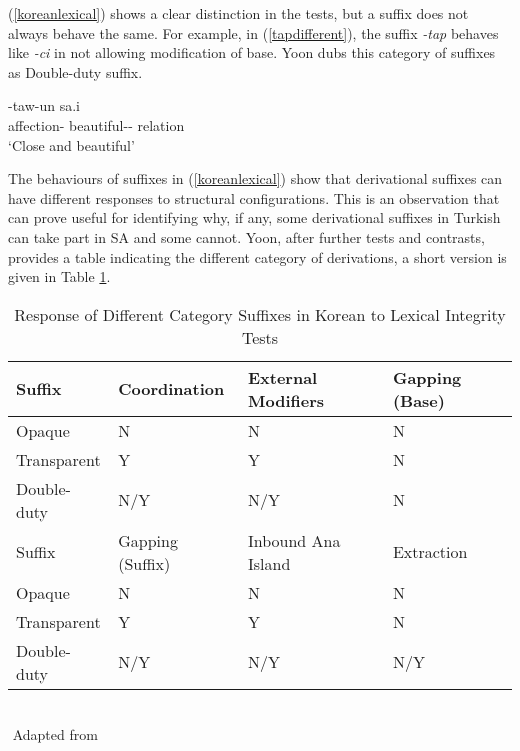 (\ref{koreanlexical}) shows a clear distinction in the tests, but a suffix does not always behave the same. For example, in (\ref{tapdifferent}), the suffix \textit{-tap} behaves like \textit{-ci} in not allowing modification of base. Yoon dubs this category of suffixes as Double-duty suffix.

\begin{exe}
    \ex \label{tapdifferent}
    -taw-un sa.i \\ 
    affection-{\And} beautiful-{\Der}-{\Rel} relation \\ 
    \glt `Close and beautiful'
\end{exe}

The behaviours of suffixes in (\ref{koreanlexical}) show that derivational suffixes can have different responses to structural configurations. This is an observation that can prove useful for identifying why, if any, some derivational suffixes in Turkish can take part in SA and some cannot. Yoon, after further tests and contrasts, provides a table indicating the different category of derivations, a short version is given in Table \ref{tab:korean}.

\begin{table}[hbt!]
    \caption{Response of Different Category Suffixes in Korean to Lexical Integrity Tests}
    \centering
    \begin{tabular}{|l|l|l|l|}
    \hline 
    Suffix      & Coordination & External Modifiers & Gapping (Base) \\ \hline %
    Opaque        & N             & N                 & N            \\ \hline %
    Transparent   & Y             & Y                 & N            \\ \hline %
    Double-duty   & N/Y           & N/Y               & N            \\ \hline \hline%
    
    Suffix      &    Gapping (Suffix)    & Inbound Ana Island    &   Extraction \\ \hline
    Opaque      &    N                   & N                     &   N   \\ \hline 
    Transparent &    Y                   & Y                     &   N \\ \hline 
    Double-duty &    N/Y                 & N/Y                   &  N/Y \\ \hline 
    \end{tabular}\\
    ${}$ \hfill Adapted from \citet{yoon2017lexical}
    \label{tab:korean}
\end{table}

